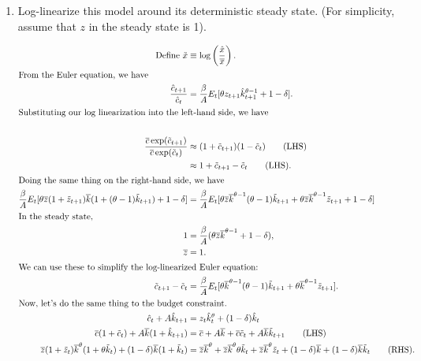 \documentclass[11pt]{article}
\begin{document}
\begin{enumerate}
\newpage
\item 
 Log-linearize this model around its deterministic steady state. (For simplicity, assume that $z$ in the steady state is 1).

\begin{align*}
\text{Define } \tilde{x} &\equiv \log\left(\frac{\hat{x}}{\overline{x}}\right).\\
\intertext{From the Euler equation, we have}
\frac{\hat{c}_{t + 1}}{\hat{c}_t} &= \frac{\beta}{A} E_t [\theta z_{t + 1}\hat{k}^{\theta - 1}_{t + 1} + 1 - \delta].\\
\intertext{Substituting our log linearization into the left-hand side, we have}\\
\frac{\overline{c}\exp(\tilde{c}_{t + 1})}{\overline{c} \exp (\tilde{c}_t)} &\approx (1 + \tilde{c}_{t + 1})(1 - \tilde{c}_t)\tag{LHS}\\
&\approx 1 + \tilde{c}_{t + 1} - \tilde{c}_t \tag{LHS}.\\
\intertext{Doing the same thing on the right-hand side, we have}
\frac{\beta}{A} E_t [\theta \overline{z} (1 + \tilde{z}_{t + 1})\overline{k}(1 + (\theta - 1)\tilde{k}_{t + 1}) + 1 - \delta] &=
\frac{\beta}{A} E_t [\theta \overline{z} \overline{k}^{\theta - 1}(\theta - 1)\tilde{k}_{t + 1} + \theta \overline{z} \overline{k}^{\theta - 1}\tilde{z}_{t + 1} + 1 - \delta]\\
\intertext{In the steady state,}
1 &= \frac{\beta}{A}(\theta \overline{z} \overline{k}^{\theta - 1} + 1 - \delta),\\
\overline{z} &= 1.\\
\intertext{We can use these to simplify the log-linearized Euler equation:} 
\tilde{c}_{t + 1} - \tilde{c}_t &= \frac{\beta}{A} E_t [\theta \overline{k}^{\theta - 1}(\theta - 1)\tilde{k}_{t + 1} + \theta \overline{k}^{\theta - 1} \tilde{z}_{t + 1}].\\
\intertext{Now, let's do the same thing to the budget constraint.}
\hat{c}_t + A\hat{k}_{t + 1} &= z_t \hat{k}_t^\theta + (1 - \delta)\hat{k}_t \\
\overline{c}(1 + \tilde{c}_t) + A \overline{k} (1 + \hat{k}_{t + 1}) &= \overline{c} + A\overline{k} + \overline{c}\tilde{c}_t + A\overline{k}\tilde{k}_{t + 1}\tag{LHS}\\
\overline{z}(1 + \tilde{z}_t)\overline{k}^\theta (1 + \theta \tilde{k}_t) + (1 - \delta)\overline{k}(1 + \tilde{k}_t) &=
\overline{z} \overline{k}^\theta + \overline{z} \overline{k}^\theta \theta \tilde{k}_t + \overline{z} \overline{k}^\theta \tilde{z}_t + (1 - \delta) \overline{k} + (1 - \delta)\overline{k} \tilde{k}_t \tag{RHS}.\\

\end{align*}
\end{enumerate}
\end{document}
